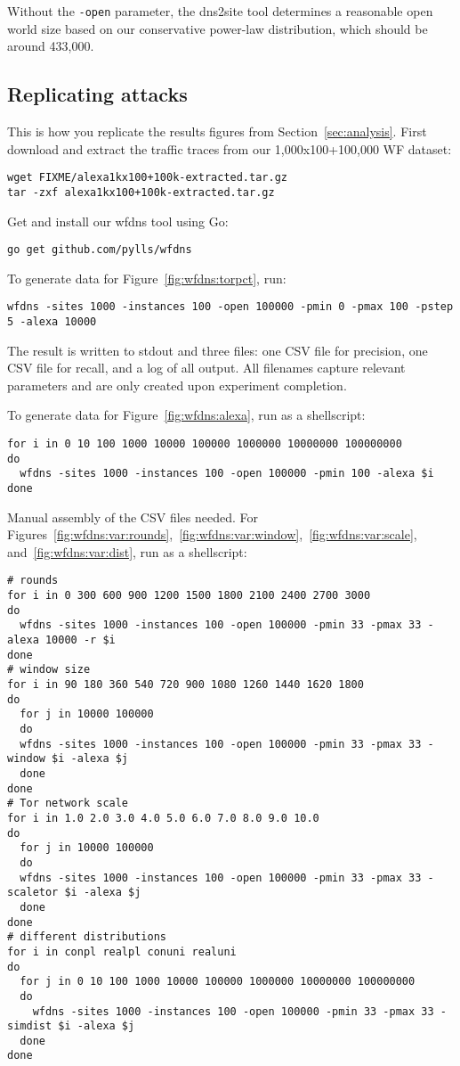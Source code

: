 Without the \texttt{-open} parameter, the dns2site tool determines a reasonable
open world size based on our conservative power-law distribution,
which should be around 433,000.

\subsection{Replicating \name attacks}
This is how you replicate the \name results figures from
Section~\ref{sec:analysis}.
First download and extract the traffic traces from our
1,000x100+100,000 WF dataset:

\begin{lstlisting}
wget FIXME/alexa1kx100+100k-extracted.tar.gz
tar -zxf alexa1kx100+100k-extracted.tar.gz
\end{lstlisting}

Get and install our wfdns tool using Go:

\begin{lstlisting}
go get github.com/pylls/wfdns
\end{lstlisting}

To generate data for Figure~\ref{fig:wfdns:torpct}, run:

\begin{lstlisting}
wfdns -sites 1000 -instances 100 -open 100000 -pmin 0 -pmax 100 -pstep 5 -alexa 10000
\end{lstlisting}

The result is written to stdout and three files: one CSV file for precision,
one CSV file for recall, and a log of all output. All filenames capture relevant
parameters and are only created upon experiment completion.

To generate data for Figure~\ref{fig:wfdns:alexa}, run as a shellscript:

\begin{lstlisting}
for i in 0 10 100 1000 10000 100000 1000000 10000000 100000000
do
  wfdns -sites 1000 -instances 100 -open 100000 -pmin 100 -alexa $i
done
\end{lstlisting}

Manual assembly of the CSV files needed. For
Figures~\ref{fig:wfdns:var:rounds},~\ref{fig:wfdns:var:window},~\ref{fig:wfdns:var:scale},
and~\ref{fig:wfdns:var:dist}, run
as a shellscript:

\begin{lstlisting}
# rounds
for i in 0 300 600 900 1200 1500 1800 2100 2400 2700 3000
do
  wfdns -sites 1000 -instances 100 -open 100000 -pmin 33 -pmax 33 -alexa 10000 -r $i
done
# window size
for i in 90 180 360 540 720 900 1080 1260 1440 1620 1800
do
  for j in 10000 100000
  do
  wfdns -sites 1000 -instances 100 -open 100000 -pmin 33 -pmax 33 -window $i -alexa $j
  done
done
# Tor network scale
for i in 1.0 2.0 3.0 4.0 5.0 6.0 7.0 8.0 9.0 10.0
do
  for j in 10000 100000
  do
  wfdns -sites 1000 -instances 100 -open 100000 -pmin 33 -pmax 33 -scaletor $i -alexa $j
  done
done
# different distributions
for i in conpl realpl conuni realuni
do
  for j in 0 10 100 1000 10000 100000 1000000 10000000 100000000
  do
    wfdns -sites 1000 -instances 100 -open 100000 -pmin 33 -pmax 33 -simdist $i -alexa $j
  done
done
\end{lstlisting}


